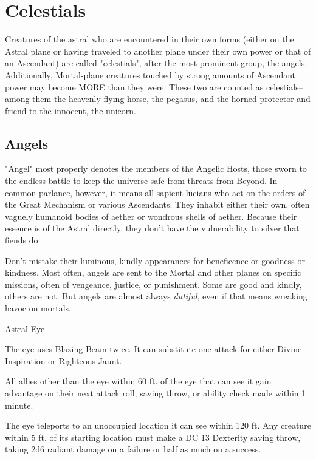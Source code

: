 \FloatBarrier
\section{Celestials}
Creatures of the astral who are encountered in their own forms (either on the Astral plane or having traveled to another plane under their own power or that of an Ascendant) are called "celestials", after the most prominent group, the angels. Additionally, Mortal-plane creatures touched by strong amounts of Ascendant power may become MORE than they were. These two are counted as celestials--among them the heavenly flying horse, the pegasus, and the horned protector and friend to the innocent, the unicorn.
\subsection{Angels}
"Angel" most properly denotes the members of the Angelic Hosts, those sworn to the endless battle to keep the universe safe from threats from Beyond. In common parlance, however, it means all sapient lucians who act on the orders of the Great Mechanism or various Ascendants. They inhabit either their own, often vaguely humanoid bodies of aether or wondrous shells of aether. Because their essence is of the Astral directly, they don't have the vulnerability to silver that fiends do.

Don't mistake their luminous, kindly appearances for beneficence or goodness or kindness. Most often, angels are sent to the Mortal and other planes on specific missions, often of vengeance, justice, or punishment. Some are good and kindly, others are not. But angels are almost always \textit{dutiful}, even if that means wreaking havoc on mortals.

\begin{DndMonster}{Astral Eye}
	\DndMonsterBasics[armor-class={13}, hit-points={45}, speed={0 ft., fly 50 ft. (hover)}]
	\DndMonsterDetails[skills={Perception +9}, damage-resistances={fire, radiant}, senses={truesight 60 ft., blindsight 60 ft., passive Perception 19}, languages={all, telepathy 60 ft.}, challenge={1:1}]
	
	
	 The eye uses Blazing Beam twice. It can substitute one attack for either Divine Inspiration or Righteous Jaunt.
	
	\DndMonsterAttack[
		name=Blazing Beam,
		distance=ranged,
		type=spell,
		mod=+5,
		range=120 ft.,
		dmg=\DndDice{1d6+3},
		dmg-type=radiant
	]
	 All allies other than the eye within 60 ft. of the eye that can see it gain advantage on their next attack roll, saving throw, or ability check made within 1 minute.
	
	 The eye teleports to an unoccupied location it can see within 120 ft. Any creature within 5 ft. of its starting location must make a DC 13 Dexterity saving throw, taking 2d6 radiant damage on a failure or half as much on a success. 
\end{DndMonster}

